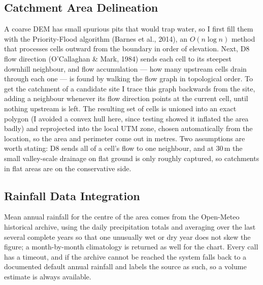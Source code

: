\documentclass[manuscript,screen]{acmart}
\begin{document}
\subsection{Catchment Area Delineation}
A coarse DEM has small spurious pits that would trap water, so I first fill them
with the Priority-Flood algorithm (Barnes et al., 2014), an $O(n\log n)$ method
that processes cells outward from the boundary in order of elevation. Next, D8 flow
direction (O'Callaghan \& Mark, 1984) sends each cell to its steepest downhill
neighbour, and flow accumulation --- how many upstream cells drain through each one
--- is found by walking the flow graph in topological order. To get the catchment
of a candidate site I trace this graph backwards from the site, adding a neighbour
whenever its flow direction points at the current cell, until nothing upstream is
left. The resulting set of cells is unioned into an exact polygon (I avoided a
convex hull here, since testing showed it inflated the area badly) and reprojected
into the local UTM zone, chosen automatically from the location, so the area and
perimeter come out in metres. Two assumptions are worth stating: D8 sends all of a
cell's flow to one neighbour, and at 30\,m the small valley-scale drainage on flat
ground is only roughly captured, so catchments in flat areas are on the
conservative side.

\subsection{Rainfall Data Integration}
Mean annual rainfall for the centre of the area comes from the Open-Meteo
historical archive, using the daily precipitation totals and averaging over the
last several complete years so that one unusually wet or dry year does not skew the
figure; a month-by-month climatology is returned as well for the chart. Every call
has a timeout, and if the archive cannot be reached the system falls back to a
documented default annual rainfall and labels the source as such, so a volume
estimate is always available.
\end{document}
